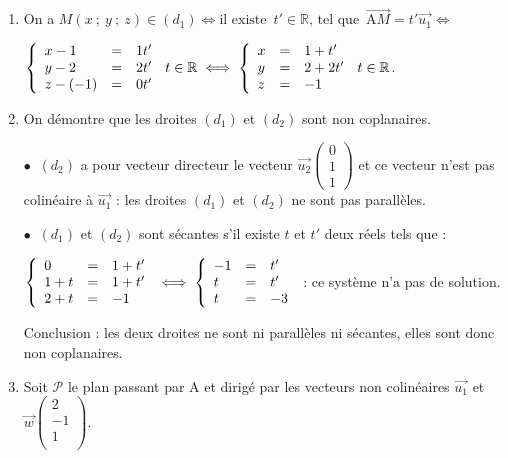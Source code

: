 \documentclass[10pt]{article}
\providecommand{\R}{\mathbb{R}}
\providecommand{\vect}[1]{\overrightarrow{#1}}
\begin{document}
\begin{enumerate}
\item 

On a $M(x~;~y~;~z) \in (d_1) \iff \text{il existe }\, t' \in \R, \, \text{tel que } \, \vect{\text{A}M} = t'\vect{u_1} \iff $

$\left\{\begin{array}{l c l}
x- 1&=&1t'\\
y - 2&=&2t'\\
z-(-1)&=&0t'
\end{array}\right.\, t \in \R \iff \left\{\begin{array}{l c l}
x &=&1 + t'\\
y &=&2 + 2t'\\
z&=&- 1
\end{array}\right.\, t \in \R $.

\item On démontre que les droites $(d_1)$ et $(d_2)$ sont non coplanaires.

$\bullet~$ $(d_2)$ a pour vecteur directeur le vecteur $\vect{u_2}\begin{pmatrix}0\\1\\1\end{pmatrix}$ et ce vecteur n'est pas colinéaire à $\vect{u_1}$ : les droites $(d_1)$ et $(d_2)$ ne sont pas parallèles.

$\bullet~$ $(d_1)$ et $(d_2)$ sont sécantes s'il existe $t$ et $t'$ deux réels tels que :

$\left\{\begin{array}{l c l}
0&=&1 + t'\\
1 + t&=&1 + t'\\
2 + t &=&-1 \\
\end{array}\right.\iff \left\{\begin{array}{l c l}
-1&=& t'\\
t & =&t'\\
t &=&-3 \\
\end{array}\right.$ : ce système n'a pas de solution.

Conclusion : les deux droites ne sont ni parallèles ni sécantes, elles sont donc non coplanaires.
\item Soit $\mathcal{P}$ le plan passant par A et dirigé par les vecteurs non colinéaires $\vect{u_1}$ et $\vect{w}\begin{pmatrix}2\\-1\\1\\\end{pmatrix}$.


\end{enumerate}
\end{document}
